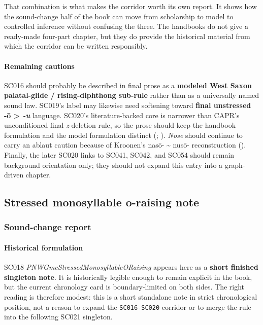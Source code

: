 \documentclass[
  british,
  a4paper,
]{article}
\begin{document}
That combination is what makes the corridor worth its own report. It
shows how the sound-change half of the book can move from scholarship to
model to controlled inference without confusing the three. The handbooks
do not give a ready-made four-part chapter, but they do provide the
historical material from which the corridor can be written responsibly.

\paragraph{Remaining cautions}\label{remaining-cautions-12}

SC016 should probably be described in final prose as a \textbf{modeled
West Saxon palatal-glide / rising-diphthong sub-rule} rather than as a
universally named sound law. SC019's label may likewise need softening
toward \textbf{final unstressed -ō \textgreater{} \emph{-u}} language.
SC020's literature-backed core is narrower than CAPR's unconditioned
final-\emph{z} deletion rule, so the prose should keep the handbook
formulation and the model formulation distinct
(; ). \emph{Nose} should continue to carry an ablaut caution because
of Kroonen's nasō- \textasciitilde{} nusō- reconstruction
(). Finally, the later SC020
links to SC041, SC042, and SC054 should remain background orientation
only; they should not expand this entry into a graph-driven chapter.

\subsection{Stressed monosyllable o-raising
note}\label{stressed-monosyllable-o-raising-note}

\subsubsection{Sound-change report}\label{sound-change-report-13}

\paragraph{Historical formulation}\label{historical-formulation-13}

SC018 \emph{PNWGmcStressedMonosyllableORaising} appears here as a
\textbf{short finished singleton note}. It is historically legible
enough to remain explicit in the book, but the current chronology card
is boundary-limited on both sides. The right reading is therefore
modest: this is a short standalone note in strict chronological
position, not a reason to expand the \texttt{SC016-SC020} corridor or to
merge the rule into the following SC021 singleton.
\end{document}
